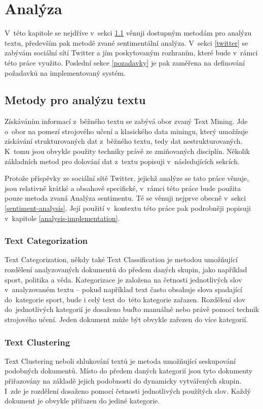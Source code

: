 \documentclass[thesis=B,czech]{FITthesis}[2012/06/26]
\begin{document}
\chapter{Analýza}
V~této kapitole se nejdříve v~sekci \ref{text-mining} věnuji dostupným metodám pro analýzu textu, především pak metodě zvané sentimentální analýza. V~sekci \ref{twitter} se zabývám sociální sítí Twitter a jím poskytovaným rozhraním, které bude v~rámci této práce využito. Poslední sekce \ref{pozadavky} je pak zaměřena na definování požadavků na implementovaný systém. 


\section{Metody pro analýzu textu}
\label{text-mining}
	Získáváním informací z~běžného textu se zabývá obor zvaný Text Mining. Jde o~obor na pomezí strojového učení a klasického data miningu, který umožňuje získávání strukturovaných dat z~běžného textu, tedy dat nestrukturovaných. K~tomu jsou obvykle použity techniky právě ze zmiňovaných disciplín. Několik základních metod pro dolování dat z~textu popisuji v~následujících sekcích. 
	
	Protože příspěvky ze sociální sítě Twitter, jejichž analýze se tato práce věnuje, jsou relativně krátké a obsahově specifické, v~rámci této práce bude použita pouze metoda zvaná Analýza sentimentu. Té se věnuji nejprve obecně v~sekci \ref{sentiment-analysis}. Její použití v~kontextu této práce pak podrobněji popisuji v~kapitole \ref{analysis-implementation}. 
	
\subsection{Text Categorization}
	Text Categorization, někdy také Text Classification je metodou umožňující rozdělení analyzovaných dokumentů do předem daných skupin, jako například sport, politika a věda. Kategorizace je založena na četnosti jednotlivých slov v~analyzovaném textu -- pokud například text často obsahuje slova spadající do~kategorie sport, bude i celý text do~této kategorie zařazen. Rozdělení slov do~jednotlivých kategorií je dosaženo buďto manuálně nebo právě pomocí technik strojového učení. Jeden dokument může být obvykle zařezen do více kategorií. 

\subsection{Text Clustering}
	Text Clustering neboli shlukování textů je metoda umožňující seskupování podobných dokumentů. Místo do předem daných kategorií jsou tyto dokumenty přiřazovány na základě jejich podobnosti do dynamicky vytvářených skupin. I~zde je rozdělení dosaženo pomocí četnosti jednotlivých použítých slov. Každý dokument je obvykle přiřazen do jediné kategorie. 
\end{document}
